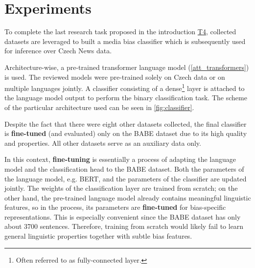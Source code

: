 \chapter{Experiments}\label{experiments}
To complete the last research task proposed in the introduction \hyperref[problem_definition]{T4}, collected datasets are leveraged to built a media bias classifier which is subsequently used for inference over Czech News data. 

Architecture-wise, a pre-trained transformer language model (\ref{att_transformers}) is used. The reviewed models were pre-trained solely on Czech data or on multiple languages jointly. A classifier consisting of a dense\footnote{Often referred to as fully-connected layer.} layer is attached to the language model output to perform the binary classification task. The scheme of the particular architecture used can be seen in \ref{fig:classifier}.


Despite the fact that there were eight other datasets collected, the final classifier is \textbf{fine-tuned} (and evaluated) only on the BABE dataset due to its high quality and properties. All other datasets serve as an auxiliary data only.

In this context, \textbf{fine-tuning} is essentially a process of adapting the language model and the classification head to the BABE dataset. Both the parameters of the language model, e.g. BERT, and the parameters of the classifier are updated jointly. The weights of the classification layer are trained from scratch; on the other hand, the pre-trained language model already contains meaningful linguistic features, so in the process, its parameters are \textbf{fine-tuned} for bias-specific representations. This is especially convenient since the BABE dataset has only about 3700 sentences. Therefore, training from scratch would likely fail to learn general linguistic properties together with subtle bias features.






\begin{figure}
\end{figure}


